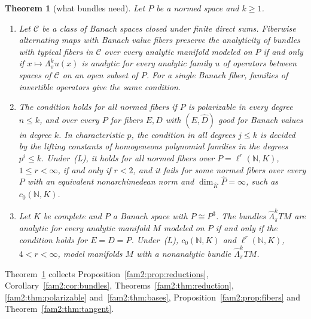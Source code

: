 \documentclass[11pt]{amsart}
\theoremstyle{definition}
\theoremstyle{remark}
\numberwithin{equation}{section}
\newcommand{\N}{\mathbb N}
\newcommand{\cC}{\mathcal{C}}
\newcommand{\Kh}{\widehat K}
\theoremstyle{plain}
\newtheorem{introtheorem}{Theorem}
\theoremstyle{definition}
\theoremstyle{plain}
\begin{document}
\begin{introtheorem}[what bundles need]\label{intro:thm:G}
Let $P$ be a normed space and $k\ge1$.
\begin{enumerate}
\item Let $\cC$ be a class of Banach spaces closed under finite direct sums. Fiberwise alternating maps with Banach value
fibers preserve the analyticity of bundles with typical fibers in $\cC$ over every analytic manifold modeled on $P$ if
and only if $x\mapsto\Lambda^k_\pi u(x)$ is analytic for every analytic family $u$ of operators between spaces of $\cC$
on an open subset of $P$. For a single Banach fiber, families of invertible operators give the same condition.
\item The condition holds for all normed fibers if $P$ is polarizable in every degree $n\le k$, and over every $P$ for
fibers $E,D$ with $(E,\widehat D)$ good for Banach values in degree $k$. In characteristic $p$, the condition in all
degrees $j\le k$ is decided by the lifting constants of homogeneous polynomial families in the degrees $p^i\le k$.
Under~\textup{(L)}, it holds for all normed fibers over $P=\ell^r(\N,K)$, $1\le r<\infty$, if and only if $r<2$, and it
fails for some normed fibers over every $P$ with an equivalent nonarchimedean norm and $\dim_{\Kh}\widehat P=\infty$,
such as $c_0(\N,K)$.
\item Let $K$ be complete and $P$ a Banach space with $P\cong P^3$. The bundles $\widehat\Lambda^k_\pi TM$ are analytic
for every analytic manifold $M$ modeled on $P$ if and only if the condition holds for $E=D=P$. Under~\textup{(L)},
$c_0(\N,K)$ and $\ell^r(\N,K)$, $4<r<\infty$, model manifolds $M$ with a nonanalytic bundle $\widehat\Lambda^k_\pi TM$.
\end{enumerate}
\end{introtheorem}

Theorem~\ref{intro:thm:G} collects Proposition~\ref{fam2:prop:reductions}, Corollary~\ref{fam2:cor:bundles},
Theorems~\ref{fam2:thm:reduction}, \ref{fam2:thm:polarizable} and~\ref{fam2:thm:bases},
Proposition~\ref{fam2:prop:fibers} and Theorem~\ref{fam2:thm:tangent}.
\end{document}
